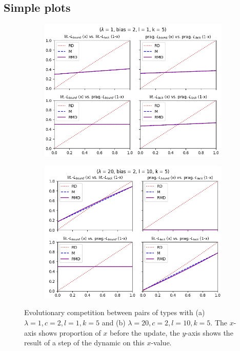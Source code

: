 \documentclass[fleqn,reqno,10pt]{article}
\begin{document}
\subsection*{Simple plots}
\begin{figure}
\centering
\begin{subfigure}{.6\textwidth}
  \centering
  \includegraphics[scale=0.45]{plot-lam01-bias2-l01-k5}
  \caption{}
  \label{fig:sub1}
\end{subfigure}%
\begin{subfigure}{.6\textwidth}
  \centering
  \includegraphics[scale=0.45]{plot-lam20-bias2-l10-k5}
  \caption{}
  \label{fig:sub2}
\end{subfigure}
\caption{Evolutionary competition between pairs of types with (a) $\lambda = 1, c = 2, l = 1, k = 5$ and (b) $\lambda = 20, c = 2, l =10, k =5$. The $x$-axis shows proportion of $x$ before the update, the $y$-axis shows the result of a step of the dynamic on this $x$-value.}
\label{fig:plots}
\end{figure}
\end{document}
